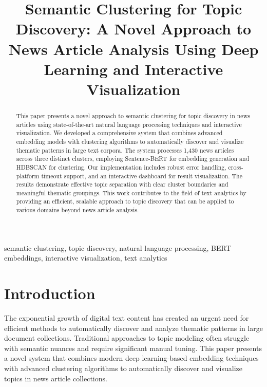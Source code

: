 \documentclass[conference]{IEEEtran}
\begin{document}
\title{Semantic Clustering for Topic Discovery: A Novel Approach to News Article Analysis Using Deep Learning and Interactive Visualization}

\author{
}

\maketitle

\begin{abstract}
This paper presents a novel approach to semantic clustering for topic discovery in news articles using state-of-the-art natural language processing techniques and interactive visualization. We developed a comprehensive system that combines advanced embedding models with clustering algorithms to automatically discover and visualize thematic patterns in large text corpora. The system processes 1,430 news articles across three distinct clusters, employing Sentence-BERT \cite{reimers2019sentence} for embedding generation and HDBSCAN \cite{campello2013density} for clustering. Our implementation includes robust error handling, cross-platform timeout support, and an interactive dashboard for result visualization. The results demonstrate effective topic separation with clear cluster boundaries and meaningful thematic groupings. This work contributes to the field of text analytics by providing an efficient, scalable approach to topic discovery that can be applied to various domains beyond news article analysis.
\end{abstract}

\begin{IEEEkeywords}
semantic clustering, topic discovery, natural language processing, BERT embeddings, interactive visualization, text analytics
\end{IEEEkeywords}

\section{Introduction}
The exponential growth of digital text content has created an urgent need for efficient methods to automatically discover and analyze thematic patterns in large document collections. Traditional approaches to topic modeling often struggle with semantic nuances and require significant manual tuning. This paper presents a novel system that combines modern deep learning-based embedding techniques \cite{devlin2018bert,vaswani2017attention} with advanced clustering algorithms to automatically discover and visualize topics in news article collections.
\end{document}
